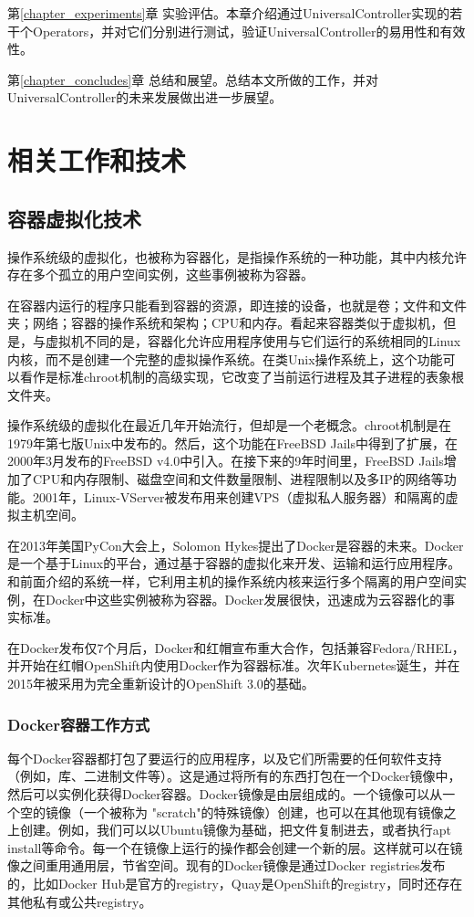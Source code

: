 \documentclass[macfonts,master]{njuthesis}
\begin{document}
第\ref{chapter_experiments}章 实验评估。本章介绍通过UniversalController实现的若干个Operators，并对它们分别进行测试，验证UniversalController的易用性和有效性。

第\ref{chapter_concludes}章 总结和展望。总结本文所做的工作，并对UniversalController的未来发展做出进一步展望。
\chapter{相关工作和技术}\label{chapter_relative}
\section{容器虚拟化技术}
操作系统级的虚拟化，也被称为容器化，是指操作系统的一种功能，其中内核允许存在多个孤立的用户空间实例，这些事例被称为容器。

在容器内运行的程序只能看到容器的资源，即连接的设备，也就是卷；文件和文件夹；网络；容器的操作系统和架构；CPU和内存。看起来容器类似于虚拟机，但是，与虚拟机不同的是，容器化允许应用程序使用与它们运行的系统相同的Linux内核，而不是创建一个完整的虚拟操作系统。在类Unix操作系统上，这个功能可以看作是标准chroot机制的高级实现，它改变了当前运行进程及其子进程的表象根文件夹。

操作系统级的虚拟化在最近几年开始流行，但却是一个老概念。chroot机制是在1979年第七版Unix中发布的。然后，这个功能在FreeBSD Jails中得到了扩展，在2000年3月发布的FreeBSD v4.0中引入。在接下来的9年时间里，FreeBSD Jails增加了CPU和内存限制、磁盘空间和文件数量限制、进程限制以及多IP的网络等功能。2001年，Linux-VServer被发布用来创建VPS（虚拟私人服务器）和隔离的虚拟主机空间。

在2013年美国PyCon大会上，Solomon Hykes提出了Docker是容器的未来。Docker是一个基于Linux的平台，通过基于容器的虚拟化来开发、运输和运行应用程序。和前面介绍的系统一样，它利用主机的操作系统内核来运行多个隔离的用户空间实例，在Docker中这些实例被称为容器。Docker发展很快，迅速成为云容器化的事实标准\cite{cloudcontainertech}。

在Docker发布仅7个月后，Docker和红帽宣布重大合作，包括兼容Fedora/RHEL，并开始在红帽OpenShift内使用Docker作为容器标准\cite{dockerredhat}。次年Kubernetes诞生，并在2015年被采用为完全重新设计的OpenShift 3.0的基础\cite{openshiftk8s}。

\subsection{Docker容器工作方式}
每个Docker容器都打包了要运行的应用程序，以及它们所需要的任何软件支持（例如，库、二进制文件等）。这是通过将所有的东西打包在一个Docker镜像中，然后可以实例化获得Docker容器。Docker镜像是由层组成的。一个镜像可以从一个空的镜像（一个被称为 "scratch"的特殊镜像）创建，也可以在其他现有镜像之上创建。例如，我们可以以Ubuntu镜像为基础，把文件复制进去，或者执行apt install等命令。每一个在镜像上运行的操作都会创建一个新的层。这样就可以在镜像之间重用通用层，节省空间。现有的Docker镜像是通过Docker registries发布的，比如Docker Hub是官方的registry，Quay是OpenShift的registry，同时还存在其他私有或公共registry。
\end{document}
